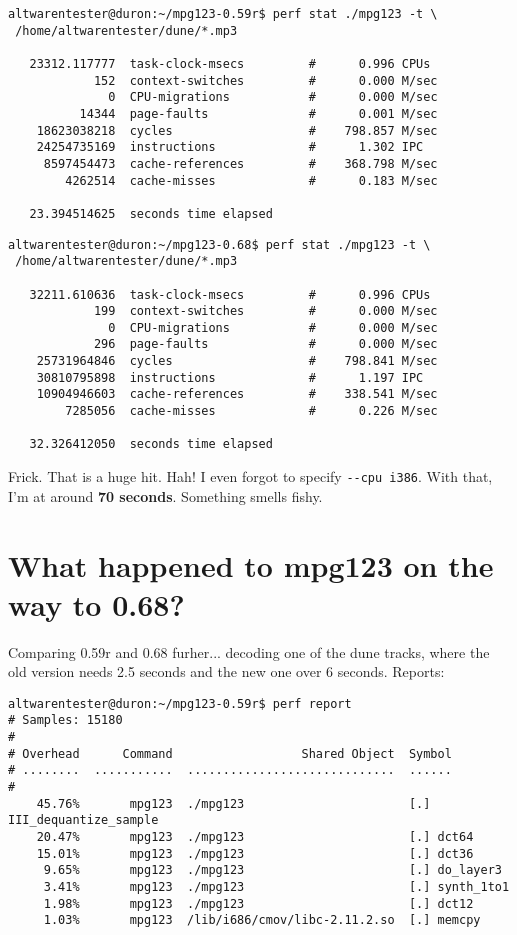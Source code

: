 \documentclass[a4paper,12pt]{scrartcl}
\begin{document}
\begin{verbatim}
altwarentester@duron:~/mpg123-0.59r$ perf stat ./mpg123 -t \
 /home/altwarentester/dune/*.mp3

   23312.117777  task-clock-msecs         #      0.996 CPUs 
            152  context-switches         #      0.000 M/sec
              0  CPU-migrations           #      0.000 M/sec
          14344  page-faults              #      0.001 M/sec
    18623038218  cycles                   #    798.857 M/sec
    24254735169  instructions             #      1.302 IPC  
     8597454473  cache-references         #    368.798 M/sec
        4262514  cache-misses             #      0.183 M/sec

   23.394514625  seconds time elapsed
\end{verbatim}
\begin{verbatim}
altwarentester@duron:~/mpg123-0.68$ perf stat ./mpg123 -t \
 /home/altwarentester/dune/*.mp3

   32211.610636  task-clock-msecs         #      0.996 CPUs 
            199  context-switches         #      0.000 M/sec
              0  CPU-migrations           #      0.000 M/sec
            296  page-faults              #      0.000 M/sec
    25731964846  cycles                   #    798.841 M/sec
    30810795898  instructions             #      1.197 IPC  
    10904946603  cache-references         #    338.541 M/sec
        7285056  cache-misses             #      0.226 M/sec

   32.326412050  seconds time elapsed
\end{verbatim}

Frick. That is a huge hit. Hah! I even forgot to specify \verb:--cpu i386:. With that, I'm at around \textbf{70 seconds}.
Something smells fishy.

\section{What happened to mpg123 on the way to 0.68?}

Comparing 0.59r and 0.68 furher... decoding one of the dune tracks, where the old version needs 2.5 seconds and the new one over 6 seconds.
Reports:

\begin{verbatim} 
altwarentester@duron:~/mpg123-0.59r$ perf report
# Samples: 15180
#
# Overhead      Command                  Shared Object  Symbol
# ........  ...........  .............................  ......
#
    45.76%       mpg123  ./mpg123                       [.] III_dequantize_sample
    20.47%       mpg123  ./mpg123                       [.] dct64
    15.01%       mpg123  ./mpg123                       [.] dct36
     9.65%       mpg123  ./mpg123                       [.] do_layer3
     3.41%       mpg123  ./mpg123                       [.] synth_1to1
     1.98%       mpg123  ./mpg123                       [.] dct12
     1.03%       mpg123  /lib/i686/cmov/libc-2.11.2.so  [.] memcpy
\end{verbatim}
\end{document}
